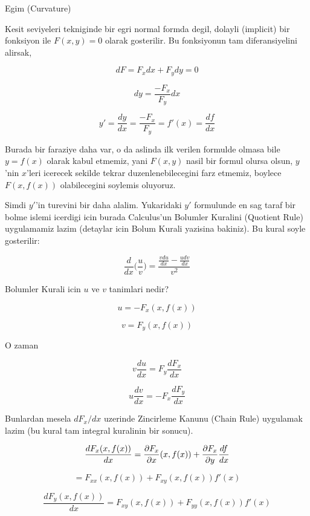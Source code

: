 \documentclass[12pt,fleqn]{article}
\begin{document}
Egim (Curvature)

Kesit seviyeleri tekniginde bir egri normal formda degil, dolayli (implicit) bir
fonksiyon ile $F(x,y) = 0$ olarak gosterilir. Bu fonksiyonun tam diferansiyelini
alirsak,

\[ dF = F_x dx + F_y dy = 0  \]

\[ dy = \frac{-F_x}{F_y}dx  \]

\[ y' = \frac{dy}{dx} = \frac{-F_x}{F_y} = f'(x) = \frac{df}{dx} \]

Burada bir faraziye daha var, o da aslinda ilk verilen formulde olmasa bile
$y=f(x)$ olarak kabul etmemiz, yani $F(x,y)$ nasil bir formul olursa olsun,
$y$'nin $x$'leri icerecek sekilde tekrar duzenlenebilecegini farz etmemiz,
boylece $F(x,f(x))$ olabilecegini soylemis oluyoruz.

Simdi $y'$'in turevini bir daha alalim. Yukaridaki $y'$ formulunde en sag
taraf bir bolme islemi icerdigi icin burada Calculus'un Bolumler Kuralini
(Quotient Rule) uygulamamiz lazim (detaylar icin Bolum Kurali yazisina
bakiniz). Bu kural soyle gosterilir:

\[ \frac{d}{dx}\bigg(\frac{u}{v}\bigg) = 
\frac{\displaystyle \frac{v du}{dx} - \frac{u dv}{dx}}{v^2} \]

Bolumler Kurali icin $u$ ve $v$ tanimlari nedir? 

\[ u = -F_x(x,f(x))  \]

\[ v = F_y(x,f(x)) \]

O zaman

\begin{equation} v \frac{du}{dx} = F_y \frac{dF_x}{dx} \label{eq1} \end{equation}

\begin{equation} u \frac{dv}{dx} = -F_x \frac{dF_y }{dx} \label{eq2} \end{equation}

Bunlardan mesela $dF_x/dx$ uzerinde Zincirleme Kanunu (Chain Rule) uygulamak
lazim (bu kural tam integral kuralinin bir sonucu). 

\[ \frac{d F_x(x,f(x)) }{dx} = \frac{\partial F_x}{\partial  x}(x,f(x))+\frac{\partial F_x}{\partial y}\frac{df}{dx}\\ \]

\begin{equation} = F_{xx}(x,f(x))+F_{xy}(x,f(x))f'(x) \label{eq3}  \end{equation}

\begin{equation} \frac{d F_y(x,f(x)) }{dx} =  F_{xy}(x,f(x))+F_{yy}(x,f(x))f'(x) \label{eq4} \end{equation}
\end{document}
